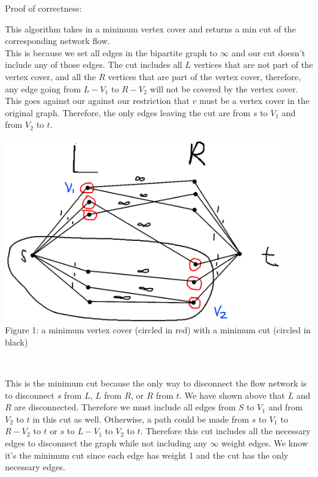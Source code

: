 \documentclass[12pt]{article}
\begin{document}
Proof of correctness:
\begin{adjustwidth}{10mm}{}
	This algorithm takes in a minimum vertex cover and returns a min cut of the corresponding network flow.\\

	This is because we set all edges in the bipartite graph to $\infty$ and our cut doesn't include
	any of those edges. The cut includes all $L$ vertices that are not part of the vertex cover,
	and all the $R$ vertices that are part of the vertex cover, therefore, any edge going from $L - V_1$ to $R - V_2$
	will not be covered by the vertex cover. This goes against our against our restriction that $v$ must be a vertex cover in the original graph.
	Therefore, the only edges leaving the cut are from $s$ to $V_1$ and from $V_2$ to $t$.\\

	\begin{center}
		\includegraphics[width=12cm,valign=m]{cscc73-a6-q2-diagram.png}\\
		\footnotesize{Figure 1: a minimum vertex cover (circled in red) with a minimum cut (circled in black)}
	\end{center}~

	This is the minimum cut because the only way to disconnect the flow network is to disconnect $s$ from $L$,
	$L$ from $R$, or $R$ from $t$. We have shown above that $L$ and $R$ are disconnected. Therefore we must include
	all edges from $S$ to $V_1$ and from $V_2$ to $t$ in this cut as well. Otherwise, a path could be made from $s$ to $V_1$ to $R-V_2$ to $t$
	or $s$ to $L-V_1$ to $V_2$ to $t$. Therefore this cut includes all the necessary edges to disconnect the graph while not including
	any $\infty$ weight edges. We know it's the minimum cut since each edge has
	weight 1 and the cut has the only necessary edges.
\end{adjustwidth}~
\end{document}

